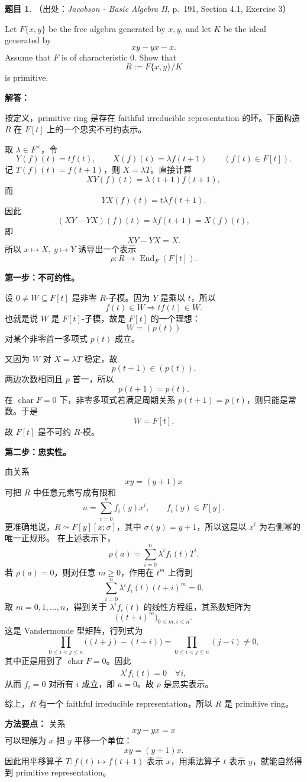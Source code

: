 \documentclass[a4paper]{ctexart}
\theoremstyle{definition}
\newtheorem{example}{题目}[section]
\theoremstyle{analysis}
\theoremstyle{plain}
\begin{document}
\begin{example}
（出处：\textit{Jacobson - Basic Algebra II}, p.~191, Section 4.1, Exercise 3）

Let \(F\{x,y\}\) be the free algebra generated by \(x,y\), and let \(K\) be the ideal generated by
\[
  xy-yx-x.
\]
Assume that \(F\) is of characteristic \(0\). Show that
\[
  R:=F\{x,y\}/K
\]
is primitive.

\textbf{解答：}

按定义，primitive ring 是存在 faithful irreducible representation 的环。下面构造 \(R\) 在 \(F[t]\) 上的一个忠实不可约表示。

取 \(\lambda\in F^\times\)，令
\[
  Y(f)(t)=t f(t),\qquad X(f)(t)=\lambda f(t+1)
  \qquad (f(t)\in F[t]).
\]
记 \(T(f)(t)=f(t+1)\)，则 \(X=\lambda T\)。直接计算
\[
  XY(f)(t)
  =
  \lambda (t+1)f(t+1),
\]
而
\[
  YX(f)(t)
  =
  t\lambda f(t+1).
\]
因此
\[
  (XY-YX)(f)(t)=\lambda f(t+1)=X(f)(t),
\]
即
\[
  XY-YX=X.
\]
所以 \(x\mapsto X,\ y\mapsto Y\) 诱导出一个表示
\[
  \rho:R\to \operatorname{End}_F(F[t]).
\]

\medskip

\textbf{第一步：不可约性。}

设 \(0\neq W\subseteq F[t]\) 是非零 \(R\)-子模。因为 \(Y\) 是乘以 \(t\)，所以
\[
  f(t)\in W \Longrightarrow t f(t)\in W.
\]
也就是说 \(W\) 是 \(F[t]\)-子模，故是 \(F[t]\) 的一个理想：
\[
  W=(p(t))
\]
对某个非零首一多项式 \(p(t)\) 成立。

又因为 \(W\) 对 \(X=\lambda T\) 稳定，故
\[
  p(t+1)\in (p(t)).
\]
两边次数相同且 \(p\) 首一，所以
\[
  p(t+1)=p(t).
\]
在 \(\operatorname{char}F=0\) 下，非零多项式若满足周期关系 \(p(t+1)=p(t)\)，则只能是常数。于是
\[
  W=F[t].
\]
故 \(F[t]\) 是不可约 \(R\)-模。

\medskip

\textbf{第二步：忠实性。}

由关系
\[
  xy=(y+1)x
\]
可把 \(R\) 中任意元素写成有限和
\[
  a=\sum_{i=0}^n f_i(y)x^i,\qquad f_i(y)\in F[y].
\]
更准确地说，\(R\simeq F[y][x;\sigma]\)，其中 \(\sigma(y)=y+1\)，所以这是以 \(x^i\) 为右侧幂的唯一正规形。
在上述表示下，
\[
  \rho(a)
  =
  \sum_{i=0}^n \lambda^i f_i(t)T^i.
\]
若 \(\rho(a)=0\)，则对任意 \(m\ge 0\)，作用在 \(t^m\) 上得到
\[
  \sum_{i=0}^n \lambda^i f_i(t)(t+i)^m=0.
\]
取 \(m=0,1,\dots,n\)，得到关于 \(\lambda^i f_i(t)\) 的线性方程组，其系数矩阵为
\[
  \bigl((t+i)^m\bigr)_{0\le m,i\le n}.
\]
这是 Vandermonde 型矩阵，行列式为
\[
  \prod_{0\le i<j\le n}\bigl((t+j)-(t+i)\bigr)
  =
  \prod_{0\le i<j\le n}(j-i)\neq 0,
\]
其中正是用到了 \(\operatorname{char}F=0\)。因此
\[
  \lambda^i f_i(t)=0
  \quad\forall i,
\]
从而 \(f_i=0\) 对所有 \(i\) 成立，即 \(a=0\)。故 \(\rho\) 是忠实表示。

综上，\(R\) 有一个 faithful irreducible representation，所以 \(R\) 是 primitive ring。

\textbf{方法要点：}
关系
\[
  xy-yx=x
\]
可以理解为 \(x\) 把 \(y\) 平移一个单位：
\[
  xy=(y+1)x.
\]
因此用平移算子 \(T:f(t)\mapsto f(t+1)\) 表示 \(x\)，用乘法算子 \(t\) 表示 \(y\)，就能自然得到 primitive representation。
\end{example}
\end{document}
